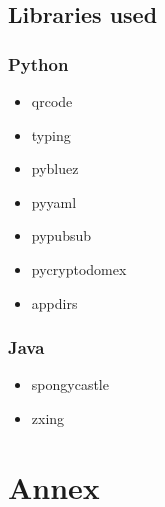 \documentclass[11,]{article}
\providecommand{\tightlist}{%
  \setlength{\itemsep}{0pt}\setlength{\parskip}{0pt}}
\begin{document}
\hypertarget{libraries-used}{%
\subsection{Libraries used}\label{libraries-used}}

\hypertarget{python}{%
\subsubsection{Python}\label{python}}

\begin{itemize}
\tightlist
\item
  qrcode
\item
  typing
\item
  pybluez
\item
  pyyaml
\item
  pypubsub
\item
  pycryptodomex
\item
  appdirs
\end{itemize}

\hypertarget{java}{%
\subsubsection{Java}\label{java}}

\begin{itemize}
\tightlist
\item
  spongycastle
\item
  zxing
\end{itemize}

\newpage

\hypertarget{annex}{%
\section{Annex}\label{annex}}
\end{document}
